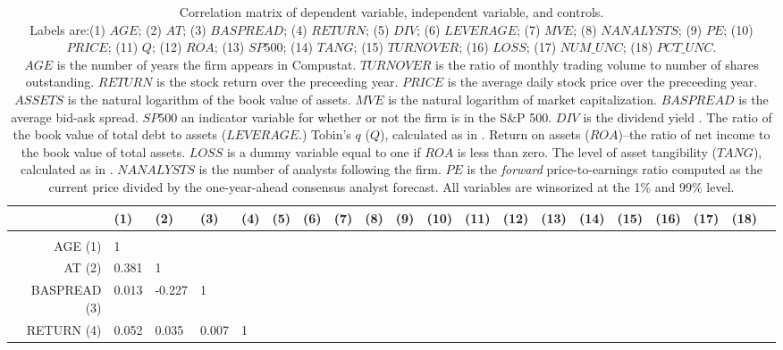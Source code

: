 \begin{sidewaystable}[H]
\tiny
\centering
\captionsetup{width=.95\textwidth}		
\caption{\footnotesize Correlation matrix of dependent variable, independent variable, and controls.\\
Labels are:(1) $AGE$; (2) $AT$; (3) $BASPREAD$; (4) $RETURN$; (5) $DIV$; (6) $LEVERAGE$; (7) $MVE$; (8) $NANALYSTS$; (9) $PE$; (10) $PRICE$; (11) $Q$; (12) $ROA$; (13) $SP500$; (14) $TANG$; (15) $TURNOVER$; (16) $LOSS$; (17) $NUM\_UNC$; (18) $PCT\_UNC$.\\
$AGE$ is the number of years the firm appears in Compustat.
$TURNOVER$ is the ratio of monthly trading volume to number of shares outstanding.
$RETURN$ is the stock return over the preceeding year.
$PRICE$ is the average daily stock price over the preceeding year.
$ASSETS$ is the natural logarithm of the book value of assets.
$MVE$ is the natural logarithm of market capitalization.
$BASPREAD$ is the average bid-ask spread.
$SP500$ an indicator variable for whether or not the firm is in the S\&P 500.
$DIV$ is the dividend yield .
The ratio of the book value of total debt to assets ($LEVERAGE$.)
Tobin's $q$ ($Q$), calculated as in \cite{chungpruitt1994}.
Return on assets  ($ROA$)--the ratio of net income to the book value of total assets.
$LOSS$ is a dummy variable equal to one if $ROA$ is less than zero.
The level of asset tangibility ($TANG$), calculated as in \cite{almeidacampello2007}. 
$NANALYSTS$ is the number of analysts following the firm.
$PE$ is the \emph{forward} price-to-earnings ratio computed as the current price divided by the one-year-ahead consensus analyst forecast.
All variables are winsorized at the 1\% and 99\% level.}\label{corr}
\begin{tabular}{rlllllllllllllllllll}
  \hline
		&	(1)	&	(2)	&	(3)	&	(4)	&	(5)	&	(6)	&	(7)	&	(8)	&	(9)	&	(10)	&	(11)	&	(12)	&	(13)	&	(14)	&	(15)	&	(16)	&	(17)	&	(18)\\
	\hline	&		&		&		&		&		&		&		&		&		&		&		&		&		&		&		&		&		&	\\
AGE	(1)	&	1	&	 	&	 	&	 	&	 	&	 	&	 	&	 	&	 	&	 	&	 	&	 	&	 	&	 	&	 	&	 	&	 	&	 \\
AT	(2)	&	0.381	&	1	&	 	&	 	&	 	&	 	&	 	&	 	&	 	&	 	&	 	&	 	&	 	&	 	&	 	&	 	&	 	&	 \\
BASPREAD	(3)	&	0.013	&	-0.227	&	1	&	 	&	 	&	 	&	 	&	 	&	 	&	 	&	 	&	 	&	 	&	 	&	 	&	 	&	 	&	 \\
RETURN	(4)	&	0.052	&	0.035	&	0.007	&	1	&	 	&	 	&	 	&	 	&	 	&	 	&	 	&	 	&	 	&	 	&	 	&	 	&	 	&	 \\

\end{tabular}
\end{sidewaystable}
